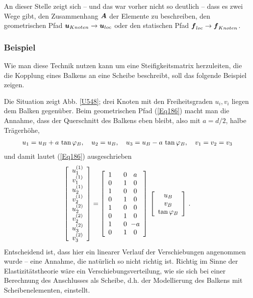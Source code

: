 {An dieser Stelle zeigt sich -- und das war vorher nicht so deutlich -- dass es zwei Wege gibt, den Zusammenhang $\mbox{\boldmath $A$}$ der Elemente zu beschreiben, den geometrischen Pfad $\mbox{\boldmath $u$}_{Knoten} \to \mbox{\boldmath $u$}_{loc}$ oder den statischen Pfad $\mbox{\boldmath $f$}_{loc} \to \mbox{\boldmath $f$}_{Knoten}$.\\


\textcolor{chapterTitleBlue}{\subsubsection*{Beispiel}}

Wie man diese Technik nutzen kann um eine Steifigkeitsmatrix herzuleiten, die die Kopplung eines Balkens an eine Scheibe beschreibt, soll das folgende Beispiel zeigen.

Die Situation zeigt Abb. \ref{U548}; drei Knoten mit den Freiheitsgraden  $u_i, v_i$ liegen dem Balken gegen\"{u}ber. Beim geometrischen Pfad (\ref{Eq186}) macht man die Annahme, dass der Querschnitt des Balkens eben bleibt, also mit $a = d/2$, halbe Tr\"{a}gerh\"{o}he,
\begin{align}
u_1 = u_B + a\,\tan \varphi_B, \quad u_2 = u_B, \quad u_3 = u_B - a\,\tan \varphi_B, \quad v_1 = v_2 = v_3
\end{align}
und damit lautet (\ref{Eq186}) ausgeschrieben
\begin{align}
\left[\barr{c} u_1^{(1)} \\ v_1^{(1)}  \\u_2^{(1)} \\ v_2^{(1)} \\ u_2^{(2)} \\ v_2^{(2)} \\ u_3^{(2) } \\ v_3^{(2)}\earr \right] = \left[\barr{c @{\hspace{6mm}} c @{\hspace{2mm}} c} 1 &0 & a \\ 0 & 1 & 0 \\ 1 & 0 & 0 \\ 0 & 1 & 0  \\ 1 & 0 & 0 \\ 0 &1 & 0 \\ 1 & 0 &- a \\ 0 & 1 & 0 \earr \right] \,\left[\barr{c} u_B \\ v_B \\ \tan \Np_B \earr \right]\,.
\end{align}
Entscheidend ist, dass hier ein linearer Verlauf der Verschiebungen angenommen wurde -- eine Annahme, die nat\"{u}rlich so nicht richtig ist. Richtig im Sinne der Elastizit\"{a}tstheorie w\"{a}re ein  Verschiebungsverteilung, wie sie sich bei einer Berechnung des Anschlusses als Scheibe, d.h. der Modellierung des Balkens mit Scheibenelementen, einstellt.

}

